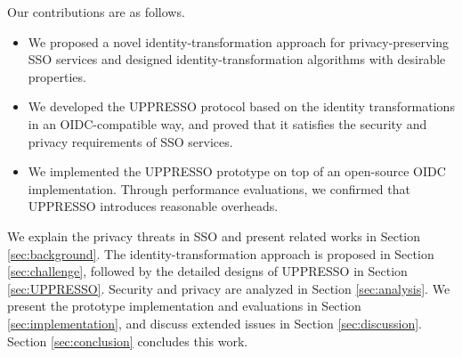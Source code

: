 Our contributions are as follows.
\begin{itemize}
\setlength{\topsep}{0pt}
\setlength{\partopsep}{0pt}
\setlength{\itemsep}{0pt}
\setlength{\parsep}{0pt}
\setlength{\parskip}{0pt}
\item We proposed a novel identity-transformation approach for privacy-preserving SSO services and designed identity-transformation algorithms with desirable properties.
\item We developed the UPPRESSO protocol based on the identity transformations in an OIDC-compatible way, and proved that it satisfies the security and privacy requirements of SSO services.
\item We implemented the UPPRESSO prototype on top of an open-source OIDC implementation. Through performance evaluations, we confirmed that UPPRESSO introduces reasonable overheads.
\end{itemize}


We explain the privacy threats in SSO and present related works in Section \ref{sec:background}.
The identity-transformation approach is proposed in Section \ref{sec:challenge}, followed by the detailed designs of UPPRESSO in Section \ref{sec:UPPRESSO}.
Security and privacy are analyzed in Section \ref{sec:analysis}.
We present the prototype implementation and evaluations in Section \ref{sec:implementation}, and discuss extended issues in Section \ref{sec:discussion}. Section \ref{sec:conclusion} concludes this work.
